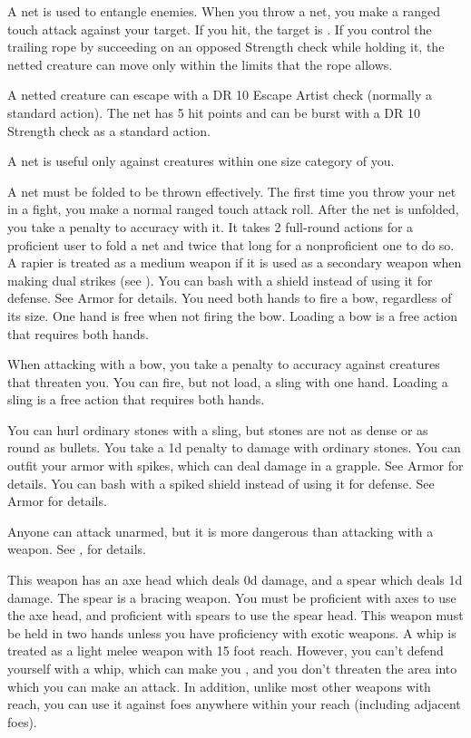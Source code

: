          A net is used to entangle enemies. When you throw a net, you make a ranged touch attack against your target. If you hit, the target is \slowed. If you control the trailing rope by succeeding on an opposed Strength check while holding it, the netted creature can move only within the limits that the rope allows.
        \par A netted creature can escape with a DR 10 Escape Artist check (normally a standard action). The net has 5 hit points and can be burst with a DR 10 Strength check as a standard action.
        \par A net is useful only against creatures within one size category of you.
        \par A net must be folded to be thrown effectively. The first time you throw your net in a fight, you make a normal ranged touch attack roll. After the net is unfolded, you take a  penalty to accuracy with it. It takes 2 full-round actions for a proficient user to fold a net and twice that long for a nonproficient one to do so.
         A rapier is treated as a medium weapon if it is used as a secondary weapon when making dual strikes (see ).
         You can bash with a shield instead of using it for defense. See Armor for details.
         You need both hands to fire a bow, regardless of its size. One hand is free when not firing the bow. Loading a bow is a free action that requires both hands.
        \par When attacking with a bow, you take a  penalty to accuracy against creatures that threaten you.
         You can fire, but not load, a sling with one hand. Loading a sling is a free action that requires both hands.
        \par You can hurl ordinary stones with a sling, but stones are not as dense or as round as bullets. You take a \minus1d penalty to damage with ordinary stones.
         You can outfit your armor with spikes, which can deal damage in a grapple. See Armor for details.
         You can bash with a spiked shield instead of using it for defense. See Armor for details.

         Anyone can attack unarmed, but it is more dangerous than attacking with a weapon. See , for details.

         This weapon has an axe head which deals \plus0d damage, and a spear which deals \minus1d damage. The spear is a bracing weapon. You must be proficient with axes to use the axe head, and proficient with spears to use the spear head.
         This weapon must be held in two hands unless you have proficiency with exotic weapons.
         A whip is treated as a light melee weapon with 15 foot reach. However, you can't defend yourself with a whip, which can make you , and you don't threaten the area into which you can make an attack. In addition, unlike most other weapons with reach, you can use it against foes anywhere within your reach (including adjacent foes).

